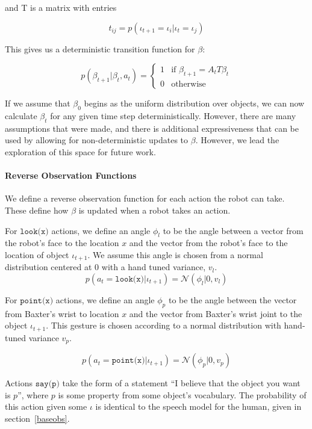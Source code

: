 \documentclass[conference]{IEEEtran}
\begin{document}
and T is a matrix with entries

\begin{equation*}
	t_{ij} = p(\iota_{t+1} = \iota_i | \iota_{t} = \iota_j)
\end{equation*}
		


This gives us a deterministic transition function for $\beta$: 

\begin{equation}
	p(\beta_{t+1} | \beta_t, a_t) = \begin{cases}
		1 & \text{if } \beta_{t+1} = A_t T \beta_t \\
		0 & \text{otherwise}
	\end{cases}
\end{equation}

If we assume that $\beta_0$ begins as the uniform distribution over objects, we can now calculate $\beta_t$ for any given time step deterministically. However, there are many assumptions that were made, and there is additional expressiveness that can be used by allowing for non-deterministic updates to $\beta$. However, we lead the exploration of this space for future work. 

\paragraph{Reverse Observation Functions} \label{reverse}

We define a reverse observation function for each action the robot can take. These define how $\beta$ is updated when a robot takes an action. 

For $\texttt{look(x)}$ actions, we define an angle $\phi_l$ to be the angle between a vector from the robot's face to the location $x$ and the vector from the robot's face to the location of object $\iota_{t+1}$. We assume this angle is chosen from a normal distribution centered at 0 with a hand tuned variance, $v_l$. 
$$p(a_{t} = \texttt{look(x)} | \iota_{t+1}) = \mathcal{N}(\phi_l | 0, v_{l})$$

For $\texttt{point(x)}$ actions, we define an angle $\phi_p$ to be the angle between the vector from Baxter's wrist to location $x$ and the vector from Baxter's wrist joint to the object $\iota_{t+1}$. This gesture is chosen according to a normal distribution with hand-tuned variance $v_p$. 

$$p(a_{t} = \texttt{point(x)} | \iota_{t+1}) = \mathcal{N}(\phi_p | 0, v_{p})$$

Actions $\texttt{say(p)}$ take the form of a statement ``I believe that the object you want is $p$'', where $p$ is some property from some object's vocabulary. The probability of this action given some $\iota$ is identical to the speech model for the human, given in section~\ref{baseobs}. 
\end{document}
